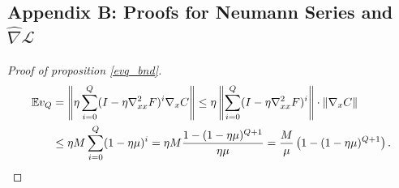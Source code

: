 \documentclass[11pt, twoside]{report}
\begin{document}
\subsection*{Appendix B: Proofs for Neumann Series and $\widehat{\nabla} \mathcal{L}$} \label{AppendixB}
\begin{proof}[Proof of proposition \ref{evq_bnd}]

\begin{align}
\mathbb{E}v_Q 
&= \left\| \eta \sum_{i=0}^Q (I - \eta \nabla_{xx}^2 F)^i \nabla_x C \right\| \leq \eta \left\| \sum_{i=0}^Q (I - \eta \nabla_{xx}^2 F)^i \right\| \cdot \|\nabla_x C\| \notag \\
&\leq \eta M \sum_{i=0}^Q (1 - \eta\mu)^i = \eta M \frac{1 - (1 - \eta\mu)^{Q+1}}{\eta\mu} \notag = \frac{M}{\mu} \left( 1 - (1 - \eta\mu)^{Q+1} \right).
\end{align}
\end{proof}
\end{document}
